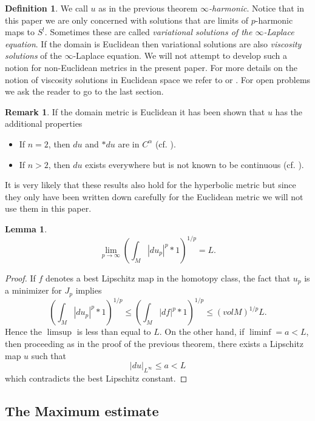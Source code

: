 \documentclass{ip-journal}
\newtheorem{lemma}[theorem]{Lemma}
\theoremstyle{definition}
\newtheorem{definition}[theorem]{Definition}
\newtheorem{remark}[theorem]{Remark}
\numberwithin{equation}{section}
\begin{document}
\begin{definition}\label{infinharm}
We call $u$ as in the previous theorem {\it{$\infty$-harmonic}}. Notice that in this paper we are only concerned with solutions that are limits of $p$-harmonic maps to $S^!$. Sometimes these are called {\it{variational solutions of the $\infty$-Laplace equation}}. If the domain is Euclidean then variational solutions are also {\it{viscosity solutions}} of the $\infty$-Laplace equation. We will not attempt to develop such a notion for non-Euclidean metrics in the present paper. For more details on the notion of viscosity solutions in Euclidean space we refer to \cite{crandal} or \cite{lindqvist}. For open problems we ask the reader to go to the last section.

\end{definition}

\begin{remark}If the domain metric is Euclidean it has been shown that $u$ has the additional properties
\begin{itemize}
\item  If $n=2$, then $du$ and $*du$ are in $C^\alpha$ (cf. \cite{evans-savin}).
\item  If $n>2$, then $du$  exists everywhere but is not known to be continuous (cf. \cite{evans-smart}).
\end{itemize}
It is very likely that these results also hold for the hyperbolic metric but since they only have been written  down carefully for the Euclidean metric  we will not use them in this paper.
\end{remark}
 
 \begin{lemma}\label{pintconvto}
\[
\lim_{p \rightarrow \infty} \left( \int_M |du_p|^p*1 \right )^{1/p} =  L.
\]
\end{lemma}
\begin{proof}If $f$ denotes a  best Lipschitz map in the homotopy class, the fact that $u_p$ is a minimizer for $J_p$ implies
\[
\left( \int_M |du_p|^p*1 \right )^{1/p}\leq \left( \int_M |df|^p*1 \right )^{1/p} \leq (vol M)^{1/p} L.
\]
Hence the $\limsup$ is less than equal to $L$. On the other hand, if $\liminf=a<L$, then proceeding as in the proof of the previous theorem, there exists a Lipschitz map $u$ such that
\[
|du|_{L^\infty}\leq a<L
\]
which contradicts the best Lipschitz constant.
\end{proof}

\subsection{The Maximum estimate}
\end{document}
